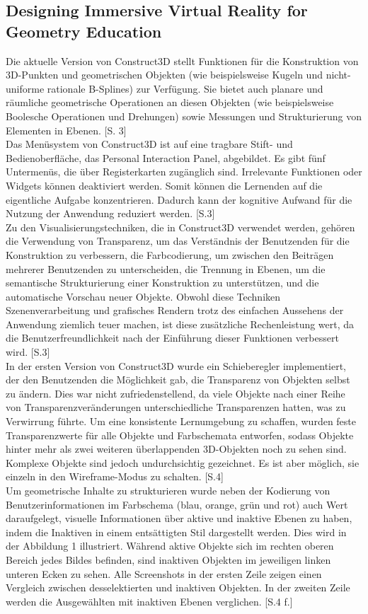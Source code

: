 \documentclass[deutsch]{llncs}
\begin{document}
\subsection{Designing Immersive Virtual Reality for Geometry Education}
\label{subsec:}
Die aktuelle Version von Construct3D stellt Funktionen für die Konstruktion von 3D-Punkten und geometrischen Objekten (wie beispielsweise Kugeln und
 nicht-uniforme rationale B-Splines) zur Verfügung. Sie bietet auch planare und räumliche geometrische Operationen an diesen Objekten
 (wie beispielsweise Boolesche Operationen und Drehungen) sowie Messungen und Strukturierung von Elementen in Ebenen. [S. 3]\\
Das Menüsystem von Construct3D ist auf eine tragbare Stift- und Bedienoberfläche, das Personal Interaction Panel, abgebildet. Es gibt fünf 
Untermenüs, die über Registerkarten zugänglich sind. Irrelevante Funktionen oder Widgets können deaktiviert werden. Somit können die 
Lernenden auf die eigentliche Aufgabe konzentrieren. Dadurch kann der kognitive Aufwand für die Nutzung der Anwendung reduziert werden. [S.3]\\
Zu den Visualisierungstechniken, die in Construct3D verwendet werden, gehören die Verwendung von Transparenz, um das Verständnis der 
Benutzenden für die Konstruktion zu verbessern, die Farbcodierung, um zwischen den Beiträgen mehrerer Benutzenden zu unterscheiden, 
die Trennung in Ebenen, um die semantische Strukturierung einer Konstruktion zu unterstützen, und die automatische Vorschau neuer Objekte. 
Obwohl diese Techniken Szenenverarbeitung und grafisches Rendern trotz des einfachen Aussehens der Anwendung ziemlich teuer machen, 
ist diese zusätzliche Rechenleistung wert, da die Benutzerfreundlichkeit nach der Einführung dieser Funktionen verbessert wird. [S.3]\\
In der ersten Version von Construct3D wurde ein Schieberegler implementiert, der den Benutzenden die Möglichkeit gab, die Transparenz von 
Objekten selbst zu ändern. Dies war nicht zufriedenstellend, da viele Objekte nach einer Reihe von Transparenzveränderungen unterschiedliche 
Transparenzen hatten, was zu Verwirrung führte. Um eine konsistente Lernumgebung zu schaffen, wurden feste Transparenzwerte für alle Objekte und
 Farbschemata entworfen, sodass Objekte hinter mehr als zwei weiteren überlappenden 3D-Objekten noch zu sehen sind. Komplexe Objekte sind 
jedoch undurchsichtig gezeichnet. Es ist aber möglich, sie einzeln in den Wireframe-Modus zu schalten. [S.4]\\
Um geometrische Inhalte zu strukturieren wurde neben der Kodierung von Benutzerinformationen im Farbschema (blau, orange, grün und rot) auch 
Wert daraufgelegt, visuelle Informationen über aktive und inaktive Ebenen zu haben, indem die Inaktiven in einem entsättigten Stil dargestellt werden. 
Dies wird in der Abbildung 1 illustriert. Während aktive Objekte sich im rechten oberen Bereich jedes Bildes befinden, sind inaktiven Objekten im jeweiligen
 linken unteren Ecken zu sehen. Alle Screenshots in der ersten Zeile zeigen einen Vergleich zwischen desselektierten und inaktiven Objekten.
 In der zweiten Zeile werden die Ausgewählten mit inaktiven Ebenen verglichen. [S.4 f.]\\
 
\end{document}
